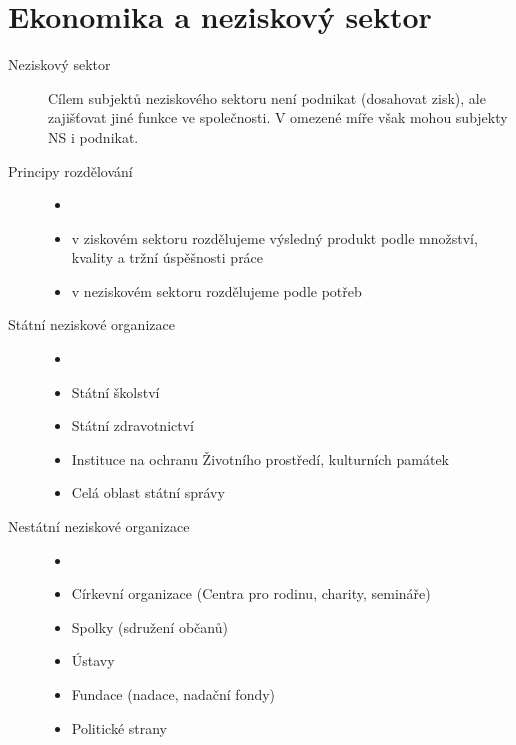 \documentclass[11pt,a4paper,twoside]{book}
\begin{document}
	\section*{Ekonomika a neziskový sektor}
		\begin{description}
			\item[Neziskový sektor] Cílem subjektů neziskového sektoru není podnikat (dosahovat zisk), ale zajišťovat jiné funkce ve společnosti. V omezené míře však mohou subjekty NS i podnikat.
			\item[Principy rozdělování]
				\begin{itemize}
					\item []
					\item v ziskovém sektoru rozdělujeme výsledný produkt podle množství, kvality a tržní úspěšnosti práce
					\item v neziskovém sektoru rozdělujeme podle potřeb
				\end{itemize}
			\item[Státní neziskové organizace]
				\begin{itemize}
					\item []
					\item Státní školství
					\item Státní zdravotnictví
					\item Instituce na ochranu Životního prostředí, kulturních památek
					\item Celá oblast státní správy
				\end{itemize}
			\item[Nestátní neziskové organizace]
				\begin{itemize}
					\item []
					\item Církevní organizace (Centra pro rodinu, charity, semináře)
					\item Spolky (sdružení občanů)
					\item Ústavy
					\item Fundace (nadace, nadační fondy)
					\item Politické strany
				\end{itemize}
		\end{description}
\end{document}
